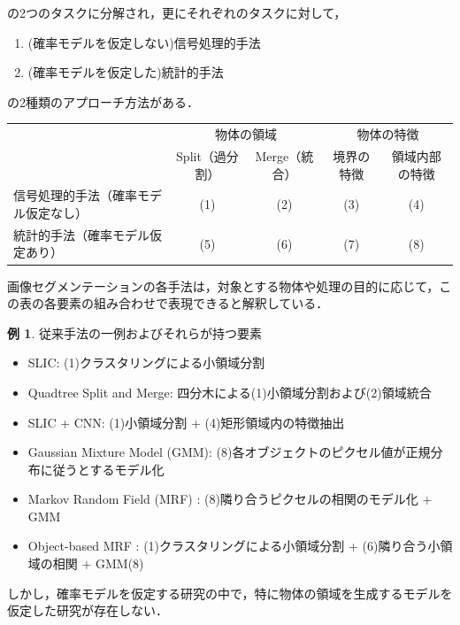 \documentclass{jsarticle}
\theoremstyle{definition}
\newtheorem{example}{例}
\begin{document}
の2つのタスクに分解され，更にそれぞれのタスクに対して，

\begin{enumerate}
  \item (確率モデルを仮定しない)信号処理的手法
  \item (確率モデルを仮定した)統計的手法
\end{enumerate}

の2種類のアプローチ方法がある．

\begin{table}[H]
  \centering
  \begin{tabular}{lcccc}
    \toprule
    & \multicolumn{2}{c}{物体の領域} & \multicolumn{2}{c}{物体の特徴} \\
    & Split（過分割） & Merge（統合） & 境界の特徴 & 領域内部の特徴 \\
    \midrule
    信号処理的手法（確率モデル仮定なし） & (1) & (2) & (3) & (4) \\
    統計的手法（確率モデル仮定あり） & (5) & (6) & (7) & (8) \\
    \bottomrule
  \end{tabular}
\end{table}

画像セグメンテーションの各手法は，対象とする物体や処理の目的に応じて，この表の各要素の組み合わせで表現できると解釈している．

\begin{example}
従来手法の一例およびそれらが持つ要素
  \begin{itemize}
    \item SLIC\cite{b10}: (1)クラスタリングによる小領域分割
    \item Quadtree Split and Merge\cite{b11}: 四分木による(1)小領域分割および(2)領域統合
    \item SLIC + CNN: (1)小領域分割 + (4)矩形領域内の特徴抽出
    \item Gaussian Mixture Model (GMM)\cite{b26}: (8)各オブジェクトのピクセル値が正規分布に従うとするモデル化
    \item Markov Random Field (MRF) \cite{b20}: (8)隣り合うピクセルの相関のモデル化 + GMM 
    \item Object-based MRF \cite{b21,b22}: (1)クラスタリングによる小領域分割 + (6)隣り合う小領域の相関 + GMM(8)
  \end{itemize}
\end{example}

しかし，確率モデルを仮定する研究の中で，特に物体の領域を生成するモデルを仮定した研究が存在しない．
\end{document}
